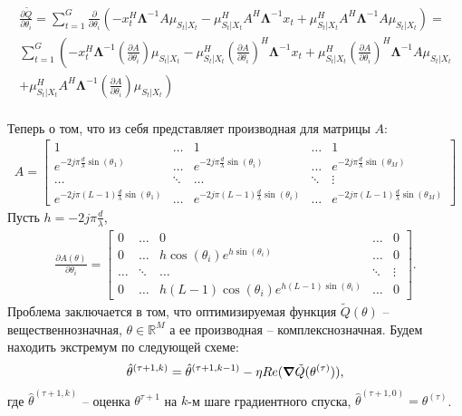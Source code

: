 \documentclass[11pt]{article}
\newcommand{\Real}{\mathbb{R}}
\begin{document}
\begin{equation}
\begin{gathered}
\frac{\partial \tilde{Q}}{\partial \theta_i} = 
\sum_{t=1}^G \frac{\partial}{\partial \theta_i} \left(-x_t^H\mathbf{\Lambda}^{-1}A\mu_{S_t|X_t}-\mu_{S_t|X_t}^HA^H\mathbf{\Lambda}^{-1}x_t  + \mu_{S_t|X_t}^HA^H\mathbf{\Lambda}^{-1}A\mu_{S_t|X_t} \right) = \\
\sum_{t=1}^G \left(-x_t^H\mathbf{\Lambda}^{-1}\left(\frac{\partial A}{\partial \theta_i}\right)\mu_{S_t|X_t}-\mu_{S_t|X_t}^H\left(\frac{\partial A}{\partial \theta_i}\right)^H\mathbf{\Lambda}^{-1}x_t  + \mu_{S_t|X_t}^H\left(\frac{\partial A}{\partial \theta_i}\right)^H\mathbf{\Lambda}^{-1}A\mu_{S_t|X_t}  \right. \\
+ \left. \mu_{S_t|X_t}^HA^H\mathbf{\Lambda}^{-1}\left(\frac{\partial A}{\partial \theta_i}\right)\mu_{S_t|X_t} \right) 
\end{gathered}
\end{equation}
\\Теперь о том, что из себя представляет производная для матрицы $A$:
\begin{gather*}
A = \begin{bmatrix}
1&\dots&1&\dots&1\\
e^{-2j\pi \frac{d}{\lambda}\sin(\theta_1)}&\dots&e^{-2j\pi \frac{d}{\lambda}\sin(\theta_i)}&\dots&e^{-2j\pi \frac{d}{\lambda}\sin(\theta_M)}\\
\dots&\ddots&\dots&\ddots&\vdots\\
e^{-2j\pi (L-1)\frac{d}{\lambda}\sin(\theta_1)}&\dots&e^{-2j\pi (L-1)\frac{d}{\lambda}\sin(\theta_i)}&\dots&e^{-2j\pi (L-1)\frac{d}{\lambda}\sin(\theta_M)}
\end{bmatrix}
\end{gather*}
Пусть $h=-2j\pi\frac{d}{\lambda}$,
\begin{gather}
\frac{\partial A(\theta)}{\partial \theta_i} = \begin{bmatrix}
0&\dots&0&\dots&0\\
0&\dots&h\cos(\theta_i)e^{h \sin(\theta_i)}&\dots&0\\
\dots&\ddots&\dots&\ddots&\vdots\\
0&\dots&h(L-1)\cos(\theta_i)e^{h(L-1)\sin(\theta_i)}&\dots&0
\end{bmatrix}.
\end{gather}
Проблема заключается в том, что оптимизируемая функция $\tilde{Q}(\theta)$ -- вещественнозначная, $\theta \in \Real^M$  а ее производная -- комплекснозначная. Будем находить экстремум по следующей схеме:
\begin{gather}
\hat{\theta}^{(\tau+1, k)}=\hat{\theta}^{(\tau+1, k-1)} - \eta Re(\grad \tilde{Q}(\theta^{(\tau)})),
\end{gather}
где $\hat{\theta}^{(\tau+1, k)}$ -- оценка $\theta^{\tau+1}$ на $k$-м шаге градиентного спуска, $\hat{\theta}^{(\tau+1, 0)} = \theta^{(\tau)}$.
\end{document}
